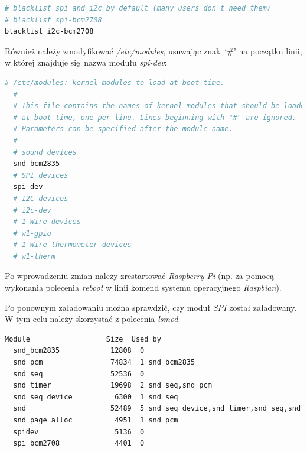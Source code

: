\documentclass[eng,printmode]{mgr}
\begin{document}
\vspace{0.5cm}
\begin{lstlisting}[language=bash,frame=single,caption={Zmodyfikowany plik \emph{/etc/modprobe.d/raspi-blacklist.conf}}]
# blacklist spi and i2c by default (many users don't need them)
# blacklist spi-bcm2708
blacklist i2c-bcm2708
\end{lstlisting}

Również należy zmodyfikować \emph{/etc/modules}, usuwając znak `\#' na początku linii, w której znajduje się nazwa modułu \emph{spi-dev}:
\vspace{0.5cm}

\begin{minipage}{\textwidth}
  \begin{lstlisting}[language=bash,frame=single,caption={Zmodyfikowany plik \emph{/etc/modules}}]
  # /etc/modules: kernel modules to load at boot time.  
  #  
  # This file contains the names of kernel modules that should be loaded  
  # at boot time, one per line. Lines beginning with "#" are ignored.  
  # Parameters can be specified after the module name.  
  #  
  # sound devices  
  snd-bcm2835  
  # SPI devices  
  spi-dev  
  # I2C devices  
  # i2c-dev  
  # 1-Wire devices  
  # w1-gpio  
  # 1-Wire thermometer devices  
  # w1-therm 
  \end{lstlisting} 
\end{minipage}

Po wprowadzeniu zmian należy zrestartować \emph{Raspberry Pi} (np. za pomocą wykonania polecenia \emph{reboot} w linii komend systemu operacyjnego \emph{Raspbian}). 

Po ponownym załadowaniu można sprawdzić, czy moduł \emph{SPI} został załadowany. W tym celu należy skorzystać z polecenia \emph{lsmod}.
\vspace{0.5cm}

\begin{minipage}{\textwidth}
  \begin{lstlisting}[language=bash,frame=single,caption={Wynik wykonania polecenia \emph{lsmod}}]
  Module                  Size  Used by
  snd_bcm2835            12808  0
  snd_pcm                74834  1 snd_bcm2835
  snd_seq                52536  0
  snd_timer              19698  2 snd_seq,snd_pcm
  snd_seq_device          6300  1 snd_seq
  snd                    52489  5 snd_seq_device,snd_timer,snd_seq,snd_pcm,snd_bcm2835
  snd_page_alloc          4951  1 snd_pcm
  spidev                  5136  0
  spi_bcm2708             4401  0
  \end{lstlisting} 
\end{minipage}
\end{document}
